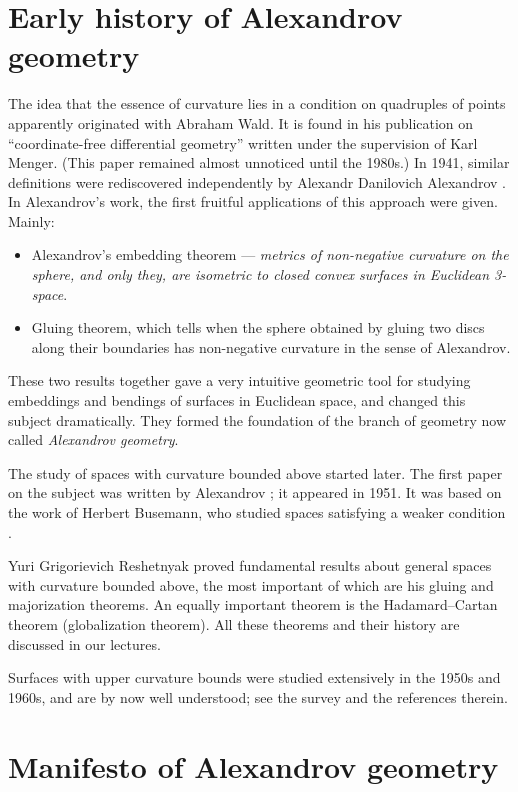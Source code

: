 \section*{Early history of Alexandrov geometry}

The idea that the essence of curvature lies in a condition on quadruples of points apparently originated with Abraham Wald.
It is found in his publication on ``coordinate-free differential geometry'' \cite{wald} written under the supervision of Karl Menger.
(This paper remained almost unnoticed until the 1980s.)
In 1941, similar definitions were rediscovered independently by
Alexandr Danilovich Alexandrov %
\cite{alexandrov-1941-def}.
In Alexandrov's work, the first fruitful applications of this approach were given.
Mainly:
\begin{itemize}
\item Alexandrov's embedding theorem --- 
\textit{metrics of non-negative curvature on the sphere, and only they, are isometric to closed convex surfaces in Euclidean 3-space}. 
\item Gluing theorem, which tells when the sphere obtained by gluing two discs along their boundaries has non-negative curvature in the sense of Alexandrov.
\end{itemize}
These two results together gave  a very intuitive geometric tool for studying  embeddings and bendings of surfaces in  Euclidean space, and changed this subject dramatically.
They formed the foundation of the branch of geometry now called \emph{Alexandrov geometry}.

The study of  spaces with curvature bounded above started later.
The first paper on the subject was written by Alexandrov \cite{alexandrov-1951}; it appeared in 1951.
It was based on the work of Herbert Busemann, who studied spaces satisfying a weaker condition \cite{busemann-CBA}.

Yuri Grigorievich Reshetnyak proved fundamental results about general spaces with curvature bounded above, the most important of which are  his gluing and majorization theorems.
An equally important theorem is the Hadamard--Cartan theorem (globalization theorem).
All these theorems and their history are discussed in our lectures.

Surfaces with upper curvature bounds were studied extensively in the 1950s and 1960s, and are by now well understood; see the survey \cite{reshetnyak:survey} and the references therein.


\section*{Manifesto of Alexandrov geometry}

